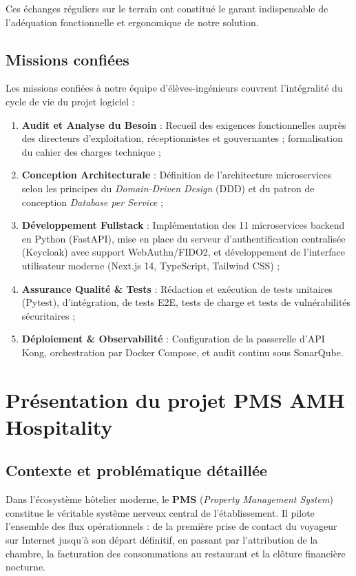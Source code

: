 \documentclass[12pt,a4paper,oneside]{report}
\begin{document}
Ces échanges réguliers sur le terrain ont constitué le garant indispensable de l'adéquation fonctionnelle et ergonomique de notre solution.

\subsection{Missions confiées}

Les missions confiées à notre équipe d'élèves-ingénieurs couvrent l'intégralité du cycle de vie du projet logiciel :
\begin{enumerate}
    \item \textbf{Audit et Analyse du Besoin} : Recueil des exigences fonctionnelles auprès des directeurs d'exploitation, réceptionnistes et gouvernantes ; formalisation du cahier des charges technique ;
    \item \textbf{Conception Architecturale} : Définition de l'architecture microservices selon les principes du \textit{Domain-Driven Design} (DDD) et du patron de conception \textit{Database per Service} ;
    \item \textbf{Développement Fullstack} : Implémentation des 11 microservices backend en Python (FastAPI), mise en place du serveur d'authentification centralisée (Keycloak) avec support WebAuthn/FIDO2, et développement de l'interface utilisateur moderne (Next.js 14, TypeScript, Tailwind CSS) ;
    \item \textbf{Assurance Qualité \& Tests} : Rédaction et exécution de tests unitaires (Pytest), d'intégration, de tests E2E, tests de charge et tests de vulnérabilités sécuritaires ;
    \item \textbf{Déploiement \& Observabilité} : Configuration de la passerelle d'API Kong, orchestration par Docker Compose, et audit continu sous SonarQube.
\end{enumerate}

\section{Présentation du projet PMS AMH Hospitality}

\subsection{Contexte et problématique détaillée}

Dans l'écosystème hôtelier moderne, le \textbf{PMS} (\textit{Property Management System}) constitue le véritable système nerveux central de l'établissement. Il pilote l'ensemble des flux opérationnels : de la première prise de contact du voyageur sur Internet jusqu'à son départ définitif, en passant par l'attribution de la chambre, la facturation des consommations au restaurant et la clôture financière nocturne.
\end{document}
